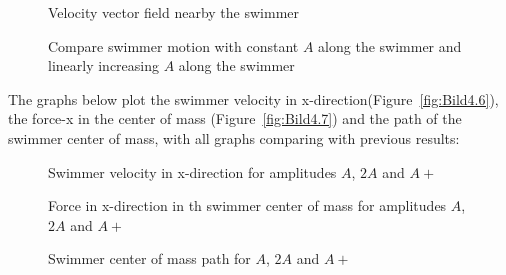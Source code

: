 \begin{figure}[H]
\centering
  \begin{footnotesize}
  
  \caption[Velocity vector field nearby the swimmer]{Velocity vector field nearby the swimmer}
   \label{fig:Bild4.12}
  \end{footnotesize}
\end{figure}

\begin{figure}[H]
\centering
  \begin{footnotesize}
  
  \caption[Compare swimmer motion with constant $A$ along the swimmer and linearly increasing $A$ along the swimmer]{Compare swimmer motion with constant $A$ along the swimmer and linearly increasing $A$ along the swimmer}
   \label{fig:Bild4.13}
  \end{footnotesize}
\end{figure}


The graphs below plot the swimmer velocity in x-direction(Figure~\ref{fig:Bild4.6}), the force-x in the center of mass (Figure~\ref{fig:Bild4.7}) and the path of the swimmer center
of mass, with all graphs comparing with previous results:



\begin{figure}[H]
\centering
  \begin{footnotesize}
  
  \caption[Swimmer velocity in x-direction for amplitudes $A$, $2A$ and $A+$ ]{Swimmer velocity in x-direction for amplitudes $A$, $2A$ and $A+$ }
   \label{fig:Bild4.14}
  \end{footnotesize}
\end{figure}


\begin{figure}[H]
\centering
  \begin{footnotesize}
  
  \caption[Force in x-direction in th swimmer center of mass for amplitudes $A$, $2A$ and $A+$]{Force in x-direction in th swimmer center of mass for amplitudes $A$, $2A$ and $A+$}
   \label{fig:Bild4.15}
  \end{footnotesize}
\end{figure}


\begin{figure}[H]
\centering
  \begin{footnotesize}
  
  \caption[Swimmer center of mass path for $A$, $2A$ and $A+$]{Swimmer center of mass path for $A$, $2A$ and $A+$}
   \label{fig:Bild4.16}
  \end{footnotesize}
\end{figure}


